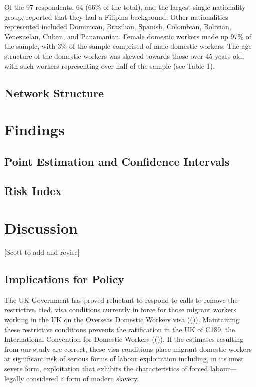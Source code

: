 \documentclass[
  12pt,
]{article}
\theoremstyle{plain}
\theoremstyle{definition}
\begin{document}
Of the 97 respondents, 64 (66\% of the total), and the largest single
nationality group, reported that they had a Filipina background. Other
nationalities represented included Dominican, Brazilian, Spanish,
Colombian, Bolivian, Venezuelan, Cuban, and Panamanian. Female domestic
workers made up 97\% of the sample, with 3\% of the sample comprised of
male domestic workers. The age structure of the domestic workers was
skewed towards those over 45 years old, with such workers representing
over half of the sample (see Table 1).

\subsection{Network Structure}\label{network-structure}

\section{Findings}\label{findings}

\subsection{Point Estimation and Confidence
Intervals}\label{point-estimation-and-confidence-intervals}

\subsection{Risk Index}\label{risk-index}

\section{Discussion}\label{discussion}

{[}Scott to add and revise{]}

\subsection{Implications for Policy}\label{implications-for-policy}

The UK Government has proved reluctant to respond to calls to remove the
restrictive, tied, visa conditions currently in force for those migrant
workers working in the UK on the Overseas Domestic Workers visa
(()).
Maintaining these restrictive conditions prevents the ratification in
the UK of C189, the International Convention for Domestic Workers
(()). If the estimates
resulting from our study are correct, these visa conditions place
migrant domestic workers at significant risk of serious forms of labour
exploitation including, in its most severe form, exploitation that
exhibits the characteristics of forced labour---legally considered a
form of modern slavery.
\end{document}
